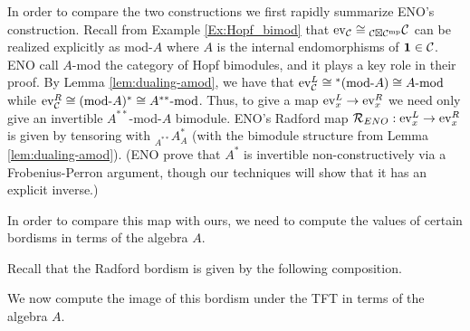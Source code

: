 \documentclass{amsart}
\begin{document}
In order to compare the two constructions we first rapidly summarize ENO's construction.  Recall from Example \ref{Ex:Hopf_bimod} that $\mathrm{ev}_\mathcal C \cong {}_{\mathcal C \boxtimes \mathcal C^{\mathrm{mp}}}\mathcal C$ can be realized explicitly as mod-$A$ where $A$ is the internal endomorphisms of $\mathbf{1} \in \mathcal C$. 
ENO call $A$-mod the category of Hopf bimodules, and it plays a key role in their proof.  By Lemma \ref{lem:dualing-amod}, we have that $\mathrm{ev}_\mathcal C^L \cong {}^*(\text{mod-}A) \cong A\text{-mod}$ while $\mathrm{ev}_\mathcal C^R \cong (\text{mod-}A)^* \cong A^{**}\text{-mod}$.  Thus, to give a map $\mathrm{ev}_x^L \rightarrow \mathrm{ev}_x^R$ we need only give an invertible $A^{**}$-mod-$A$ bimodule.  ENO's Radford map $\mathcal R_{ENO}: \mathrm{ev}_x^L \rightarrow \mathrm{ev}_x^R$ is given by tensoring with ${}_{A^{**}}A^*_A$ (with the bimodule structure from Lemma \ref{lem:dualing-amod}).  (ENO prove that $A^*$ is invertible non-constructively via a Frobenius-Perron argument, though our techniques will show that it has an explicit inverse.)


In order to compare this map with ours, we need to compute the values of certain bordisms in terms of the algebra $A$.

Recall that the Radford bordism is given by the following composition.

\vspace{.5in}
\nid {}
\vspace{.5in}

We now compute the image of this bordism under the TFT in terms of the algebra $A$.
\end{document}
